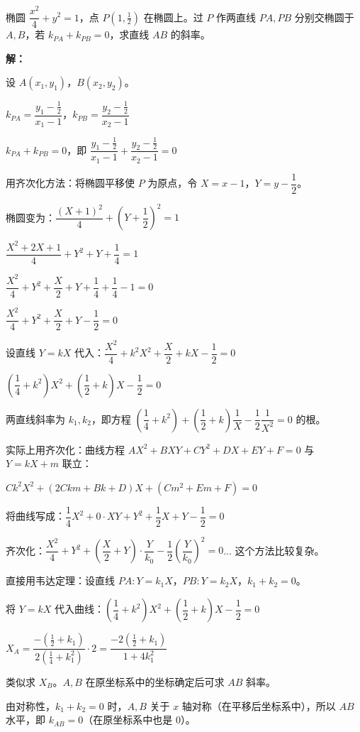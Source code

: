 \documentclass[12pt, a4paper]{ctexart}
\begin{document}
\begin{examplebox}
椭圆 $\dfrac{x^2}{4}+y^2=1$，点 $P(1,\frac{1}{2})$ 在椭圆上。过 $P$ 作两直线 $PA,PB$ 分别交椭圆于 $A,B$，若 $k_{PA}+k_{PB}=0$，求直线 $AB$ 的斜率。

\textbf{解：}

设 $A(x_1,y_1)$，$B(x_2,y_2)$。

$k_{PA}=\dfrac{y_1-\frac{1}{2}}{x_1-1}$，$k_{PB}=\dfrac{y_2-\frac{1}{2}}{x_2-1}$

$k_{PA}+k_{PB}=0$，即 $\dfrac{y_1-\frac{1}{2}}{x_1-1}+\dfrac{y_2-\frac{1}{2}}{x_2-1}=0$

用齐次化方法：将椭圆平移使 $P$ 为原点，令 $X=x-1$，$Y=y-\dfrac{1}{2}$。

椭圆变为：$\dfrac{(X+1)^2}{4}+\left(Y+\dfrac{1}{2}\right)^2=1$

$\dfrac{X^2+2X+1}{4}+Y^2+Y+\dfrac{1}{4}=1$

$\dfrac{X^2}{4}+Y^2+\dfrac{X}{2}+Y+\dfrac{1}{4}+\dfrac{1}{4}-1=0$

$\dfrac{X^2}{4}+Y^2+\dfrac{X}{2}+Y-\dfrac{1}{2}=0$

设直线 $Y=kX$ 代入：$\dfrac{X^2}{4}+k^2 X^2+\dfrac{X}{2}+kX-\dfrac{1}{2}=0$

$\left(\dfrac{1}{4}+k^2\right)X^2+\left(\dfrac{1}{2}+k\right)X-\dfrac{1}{2}=0$

两直线斜率为 $k_1,k_2$，即方程 $\left(\dfrac{1}{4}+k^2\right)+\left(\dfrac{1}{2}+k\right)\dfrac{1}{X}-\dfrac{1}{2}\dfrac{1}{X^2}=0$ 的根。

实际上用齐次化：曲线方程 $AX^2+BXY+CY^2+DX+EY+F=0$ 与 $Y=kX+m$ 联立：

$Ck^2 X^2+(2Ckm+Bk+D)X+(Cm^2+Em+F)=0$

将曲线写成：$\dfrac{1}{4}X^2+0\cdot XY+Y^2+\dfrac{1}{2}X+Y-\dfrac{1}{2}=0$

齐次化：$\dfrac{X^2}{4}+Y^2+\left(\dfrac{X}{2}+Y\right)\cdot\dfrac{Y}{k_0}-\dfrac{1}{2}\left(\dfrac{Y}{k_0}\right)^2=0$... 这个方法比较复杂。

直接用韦达定理：设直线 $PA: Y=k_1 X$，$PB: Y=k_2 X$，$k_1+k_2=0$。

将 $Y=kX$ 代入曲线：$\left(\dfrac{1}{4}+k^2\right)X^2+\left(\dfrac{1}{2}+k\right)X-\dfrac{1}{2}=0$

$X_A=\dfrac{-(\frac{1}{2}+k_1)}{2(\frac{1}{4}+k_1^2)}\cdot 2=\dfrac{-2(\frac{1}{2}+k_1)}{1+4k_1^2}$

类似求 $X_B$。$A,B$ 在原坐标系中的坐标确定后可求 $AB$ 斜率。

由对称性，$k_1+k_2=0$ 时，$A,B$ 关于 $x$ 轴对称（在平移后坐标系中），所以 $AB$ 水平，即 $k_{AB}=\boxed{0}$（在原坐标系中也是 $0$）。
\end{examplebox}
\end{document}
